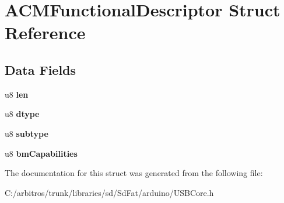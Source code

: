 \hypertarget{struct_a_c_m_functional_descriptor}{\section{A\-C\-M\-Functional\-Descriptor Struct Reference}
\label{struct_a_c_m_functional_descriptor}
}
\subsection*{Data Fields}
\begin{DoxyCompactItemize}
\item 
\hypertarget{struct_a_c_m_functional_descriptor_afbf3f3230446569534d5f466aaf4c23b}{u8 {\bfseries len}}\label{struct_a_c_m_functional_descriptor_afbf3f3230446569534d5f466aaf4c23b}

\item 
\hypertarget{struct_a_c_m_functional_descriptor_a0bb419531ec75697e63e9109fecf81b0}{u8 {\bfseries dtype}}\label{struct_a_c_m_functional_descriptor_a0bb419531ec75697e63e9109fecf81b0}

\item 
\hypertarget{struct_a_c_m_functional_descriptor_afb82dd1313bc5284e4e5aef8218ef414}{u8 {\bfseries subtype}}\label{struct_a_c_m_functional_descriptor_afb82dd1313bc5284e4e5aef8218ef414}

\item 
\hypertarget{struct_a_c_m_functional_descriptor_a9ad7ca27543639baeed1b53c6f24e149}{u8 {\bfseries bm\-Capabilities}}\label{struct_a_c_m_functional_descriptor_a9ad7ca27543639baeed1b53c6f24e149}

\end{DoxyCompactItemize}


The documentation for this struct was generated from the following file\-:\begin{DoxyCompactItemize}
\item 
C\-:/arbitros/trunk/libraries/sd/\-Sd\-Fat/arduino/U\-S\-B\-Core.\-h\end{DoxyCompactItemize}
